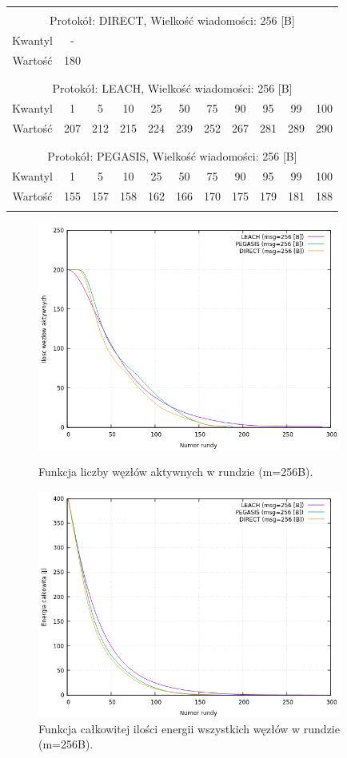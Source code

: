 \documentclass[a4paper,12pt,twoside,openany]{report}
\begin{document}
\begin{longtable}{*{11}{c}}
\toprule \\*
\multicolumn{11}{c}{Protokół: DIRECT, Wielkość wiadomości: 256 [B]} \\*
Kwantyl	& -	\\*
Wartość	& 180	\\*
\midrule \\*
\\*
\multicolumn{11}{c}{Protokół: LEACH, Wielkość wiadomości: 256 [B]} \\*
Kwantyl	& 1	& 5	& 10	& 25	& 50	& 75	& 90	& 95	& 99	& 100	\\*
Wartość	& 207	& 212	& 215	& 224	& 239	& 252	& 267	& 281	& 289	& 290	\\*
\midrule \\*
\\*
\multicolumn{11}{c}{Protokół: PEGASIS, Wielkość wiadomości: 256 [B]} \\*
Kwantyl	& 1	& 5	& 10	& 25	& 50	& 75	& 90	& 95	& 99	& 100	\\*
Wartość	& 155	& 157	& 158	& 162	& 166	& 170	& 175	& 179	& 181	& 188	\\*
\bottomrule \\*
\end{longtable}

\begin{figure}[H]
 \centering
 \includegraphics[width=10cm]{images/gnuplot/test_1/nodes_in_round_m256.png}
 \caption{Funkcja liczby węzłów aktywnych w rundzie (m=256B).}
 \includegraphics[width=10cm]{images/gnuplot/test_1/energy_in_round_m256.png}
 \caption{Funkcja całkowitej ilości energii wszystkich węzłów w rundzie (m=256B).}
\end{figure}
\end{document}
